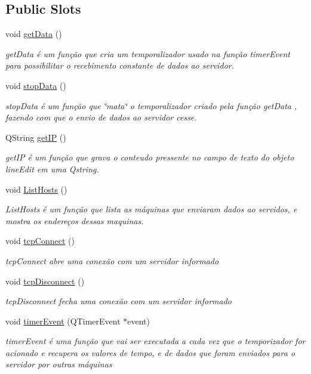 \subsection*{Public Slots}
\begin{DoxyCompactItemize}
\item 
void \hyperlink{class_main_window_a4a2ddf4cf2ec8e240cc340416b1df792}{get\+Data} ()
\begin{DoxyCompactList}\small\item\em get\+Data é um função que cria um temporalizador usado na função timer\+Event para possibilitar o recebimento constante de dados ao servidor. \end{DoxyCompactList}\item 
void \hyperlink{class_main_window_a79fdaf1fd769f0584f50da34e415b3de}{stop\+Data} ()
\begin{DoxyCompactList}\small\item\em stop\+Data é um função que \char`\"{}mata\char`\"{} o temporalizador criado pela função get\+Data , fazendo com que o envio de dados ao servidor cesse. \end{DoxyCompactList}\item 
Q\+String \hyperlink{class_main_window_a2bf0fb2c40fb08b96f95f65d9ee1c979}{get\+IP} ()
\begin{DoxyCompactList}\small\item\em get\+IP é um função que grava o conteudo pressente no campo de texto do objeto line\+Edit em uma Qstring. \end{DoxyCompactList}\item 
void \hyperlink{class_main_window_aa1b929ac26c3c547b2904e88b7f70284}{List\+Hosts} ()
\begin{DoxyCompactList}\small\item\em List\+Hosts é um função que lista as máquinas que enviaram dados ao servidos, e mostra os endereços dessas maquinas. \end{DoxyCompactList}\item 
void \hyperlink{class_main_window_ac5b669957c442b6eb68573dacfce33e1}{tcp\+Connect} ()
\begin{DoxyCompactList}\small\item\em tcp\+Connect abre uma conexão com um servidor informado \end{DoxyCompactList}\item 
void \hyperlink{class_main_window_a4d22c4c7afc7ba0a2fa4c70515c85dda}{tcp\+Disconnect} ()
\begin{DoxyCompactList}\small\item\em tcp\+Disconnect fecha uma conexão com um servidor informado \end{DoxyCompactList}\item 
void \hyperlink{class_main_window_aaa425b1554af3c1f58cc70b4815082ae}{timer\+Event} (Q\+Timer\+Event $\ast$event)
\begin{DoxyCompactList}\small\item\em timer\+Event é uma função que vai ser executada a cada vez que o temporizador for acionado e recupera os valores de tempo, e de dados que foram enviados para o servidor por outras máquinas \end{DoxyCompactList}\end{DoxyCompactItemize}
